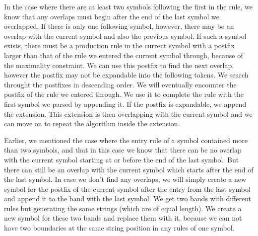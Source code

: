 In the case where there are at least two symbols following the first in the rule, we know that any overlaps must begin 
after the end of the last symbol we overlapped. If there is only one following symbol, however, there may be an overlap 
with the current symbol and also the previous symbol. If such a symbol exists, there must be a production rule in the 
current symbol with a postfix larger than that of the rule we entered the current symbol through, because of the 
maximality constraint. We can use this postfix to find the next overlap, however the postfix may not be expandable into 
the following tokens. We search throught the postfixes in descending order. We will eventually encounter the postfix of 
the rule we entered through. We use it to complete the rule with the first symbol we parsed by appending it. If the 
postfix is expandable, we append the extension. This extension is then overlapping with the current symbol and we can 
move on to repeat the algorithm inside the extension.

Earlier, we mentioned the case where the entry rule of a symbol contained more than two symbols, and that in this case 
we know that there can be no overlap with the current symbol starting at or before the end of the last symbol. But there 
can still be an overlap with the current symbol which starts after the end of the last symbol. In case we don't find any 
overlaps, we will simply create a new symbol for the postfix of the current symbol after the entry from the last symbol 
and append it to the band with the last symbol. We get two bands with different rules but generating the same strings 
(which are of equal length). We create a new symbol for these two bands and replace them with it, because we can not have 
two boundaries at the same string position in any rules of one symbol. 

